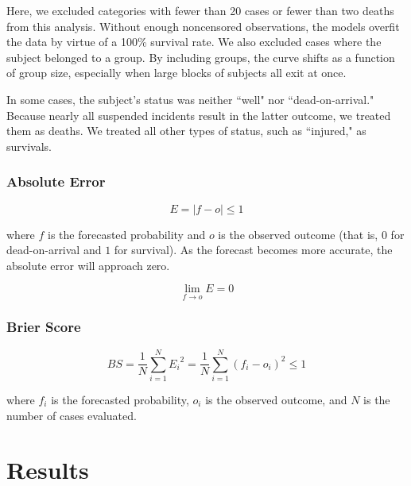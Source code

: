 \documentclass[12pt,titlepage]{article}
\begin{document}
      Here, we excluded categories with fewer than 20 cases or fewer than two
      deaths from this analysis. Without enough noncensored observations, the
      models overfit the data by virtue of a 100\% survival rate. We also
      excluded cases where the subject belonged to a group. By including
      groups, the curve shifts as a function of group size, especially when
      large blocks of subjects all exit at once.



      In some cases, the subject's status was neither ``well" nor
      ``dead-on-arrival." Because nearly all suspended incidents result in the
      latter outcome, we treated them as deaths. We treated all other types of
      status, such as ``injured," as survivals.

      \subsubsection{Absolute Error}

        $$E = |f - o| \leq 1$$

        where $f$ is the forecasted probability and $o$ is the observed outcome
        (that is, $0$ for dead-on-arrival and $1$ for survival). As the
        forecast becomes more accurate, the absolute error will approach zero.

        $$\lim_{f \to o} E = 0$$

      \subsubsection{Brier Score}
        \cite{brier+score}

        $$BS = \frac{1}{N} \sum_{i=1}^N {E_i}^2 = \frac{1}{N} \sum_{i=1}^N (f_i - o_i)^2 \leq 1$$

        where $f_i$ is the forecasted probability, $o_i$ is the observed
        outcome, and $N$ is the number of cases evaluated.

  \section{Results}
\end{document}
